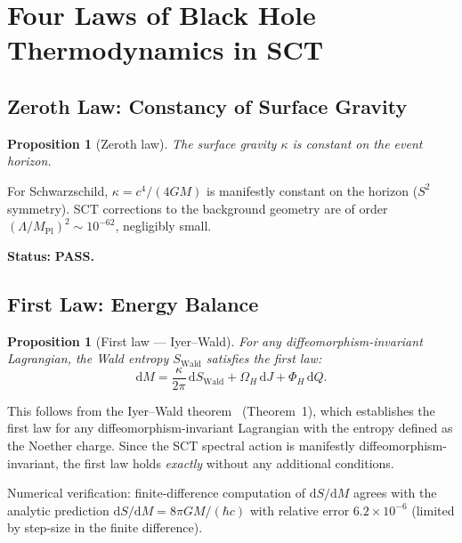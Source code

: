 \documentclass[11pt,a4paper]{article}
\renewcommand{\dd}{\mathrm{d}}
\theoremstyle{plain}
\newtheorem{proposition}[theorem]{Proposition}
\theoremstyle{definition}
\begin{document}
\section{Four Laws of Black Hole Thermodynamics in SCT}
\label{sec:four-laws}

\subsection{Zeroth Law: Constancy of Surface Gravity}

\begin{proposition}[Zeroth law]\label{prop:zeroth}
The surface gravity $\kappa$ is constant on the event horizon.
\end{proposition}

For Schwarzschild, $\kappa = c^4/(4GM)$ is manifestly constant
on the horizon ($S^2$ symmetry).  SCT corrections to the
background geometry are of order
$(\Lambda/M_{\mathrm{Pl}})^2 \sim 10^{-62}$, negligibly small.

\noindent\textbf{Status:} \textcolor{green!50!black}{\textbf{PASS.}}

\subsection{First Law: Energy Balance}

\begin{proposition}[First law --- Iyer--Wald]\label{prop:first}
For any diffeomorphism-invariant Lagrangian, the Wald entropy
$S_{\mathrm{Wald}}$ satisfies the first law:
\begin{equation}\label{eq:first-law}
  \dd M = \frac{\kappa}{2\pi}\,\dd S_{\mathrm{Wald}}
  + \Omega_H\,\dd J + \Phi_H\,\dd Q.
\end{equation}
\end{proposition}

This follows from the Iyer--Wald theorem~\cite{IW94}
(Theorem~1), which establishes the first law for any
diffeomorphism-invariant Lagrangian with the entropy defined
as the Noether charge.  Since the SCT spectral action is
manifestly diffeomorphism-invariant, the first law holds
\emph{exactly} without any additional conditions.

Numerical verification: finite-difference computation of
$\dd S/\dd M$ agrees with the analytic prediction
$\dd S/\dd M = 8\pi GM/(\hbar c)$ with relative error
$6.2 \times 10^{-6}$ (limited by step-size in the finite
difference).
\end{document}
